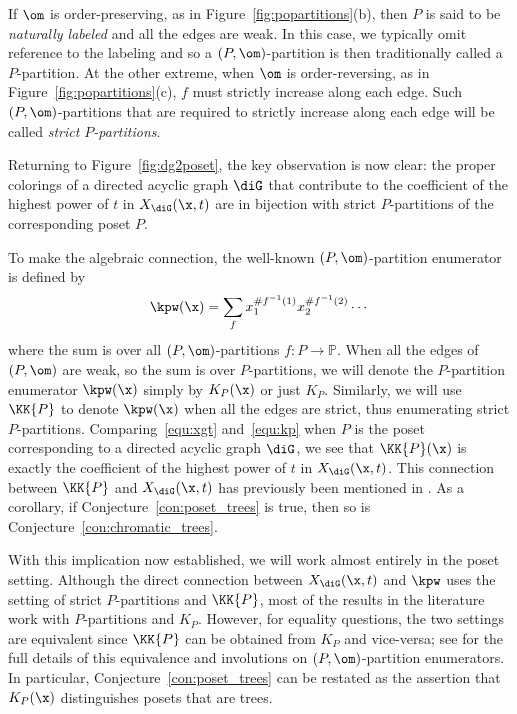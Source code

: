 If $\om$ is order-preserving, as in Figure~\ref{fig:popartitions}(b), then $P$ is said to be \emph{naturally labeled} and all the edges are weak.  In this case, we typically omit reference to the labeling and so a $(P,\om)$-partition is then traditionally called a $P$-partition.  At the other extreme, when $\om$ is order-reversing, as in Figure~\ref{fig:popartitions}(c), $f$ must strictly increase along each edge. Such $(P,\om)$-partitions that are required to strictly increase along each edge will be called \emph{strict $P$-partitions}.  

Returning to Figure~\ref{fig:dg2poset}, the key observation is now clear: the proper colorings of a directed acyclic graph $\diG$ that contribute to the coefficient of the highest power of $t$ in $X_{\diG}(\x,t)$ are in bijection with strict $P$-partitions of the corresponding poset $P$.  

To make the algebraic connection, the well-known $(P,\om)$-partition enumerator is defined by 
\begin{equation}\label{equ:kp}
\kpw(\x) = \sum_{f} x_1^{\#f^{-1}(1)} x_2^{\# f^{-1}(2)} \cdots
\end{equation}
where the sum is over all $(P,\om)$-partitions $f:P \to \mathbb{P}$.  When all the edges of $(P,\om)$ are weak, so the sum is over $P$-partitions, we will denote the $P$-partition enumerator $\kpw(\x)$ simply by $K_P(\x)$ or just $K_P$.  Similarly, we will use $\KK{P}$ to denote $\kpw(\x)$ when all the edges are strict, thus enumerating strict $P$-partitions.  Comparing~\eqref{equ:xgt} and~\eqref{equ:kp} when $P$ is the poset corresponding to a directed acyclic graph $\diG$, we see that $\KK{P}(\x)$  is exactly the coefficient of the highest power of $t$ in $X_{\diG}(\x,t)$.   This connection between $\KK{P}$ and $X_{\diG}(\x, t)$ has previously been mentioned in \cite[Theorem~7.4]{AlSu21} \cite[p.~11]{Ell17+}.  As a corollary, if Conjecture~\ref{con:poset_trees} is true, then so is Conjecture~\ref{con:chromatic_trees}.

With this implication now established, we will work almost entirely in the poset setting.  Although the direct connection between $X_{\diG}(\x, t)$ and $\kpw$ uses the setting of strict $P$-partitions and $\KK{P}$, most of the results in the literature work with $P$-partitions and $K_P$.  However, for equality questions, the two settings are equivalent since $\KK{P}$ can be obtained from $K_P$ and vice-versa; see \cite[\S 3]{McWa14} for the full details of this equivalence and involutions on $(P,\om)$-partition enumerators.  In particular, Conjecture~\ref{con:poset_trees} can be restated as the assertion that $K_P(\x)$ distinguishes posets that are trees.

